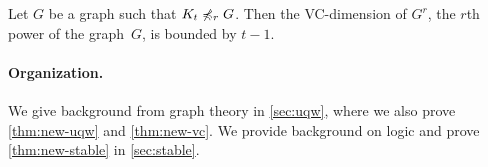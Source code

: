 \begin{theorem}\label{thm:new-vc}
Let $G$ be a graph such that $K_t\not\preccurlyeq_r G$. Then the
VC-dimension of $G^r$, the $r$th power of the graph~$G$, is bounded by $t-1$. 
\end{theorem}

\paragraph{Organization.} We give background from graph theory in \cref{sec:uqw}, where we also
prove \cref{thm:new-uqw} and \cref{thm:new-vc}. We provide background 
on logic and prove \cref{thm:new-stable} in \cref{sec:stable}. 



